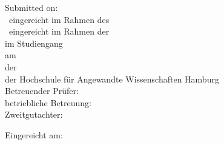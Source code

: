 {\begin{textblock*}{\textwidth}
\begin{minipage}[b]{\textwidth}
        Submitted on: \ISubDate \\
      \else
      	\ifdefined\IisInternshipReport
        \IthesisKindDE ~eingereicht im Rahmen des \IthesisExaminationDE \\	
	\else
        \IthesisKindDE ~eingereicht im Rahmen der \IthesisExaminationDE \\
        \fi
	im Studiengang \textit{\IstudyCourseName} \\
        am \IthesisDepartmentFull \\
        der \IthesisFacultyFull \\
        der Hochschule für Angewandte Wissenschaften Hamburg\\

        Betreuender Prüfer: \IfirstSv \\
        \ifdefined\IisTermPaper
        \else
          \ifdefined\IisInternshipReport
        betriebliche Betreuung: \IsecondSv \\							
	  \else
        Zweitgutachter: \IsecondSv \\
        \fi\fi

        Eingereicht am: \ISubDate \\
      \fi
    \end{minipage}
  \end{textblock*}
}

